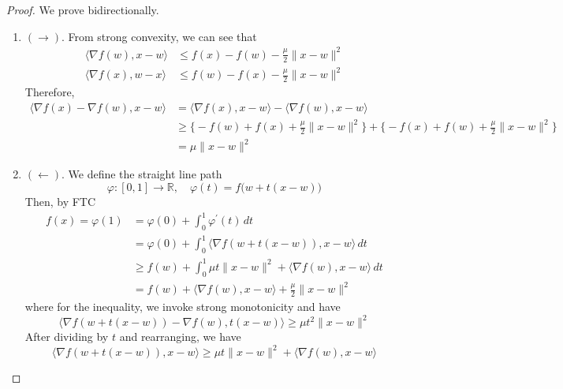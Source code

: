 	\begin{proof}
	  We prove bidirectionally. 
		\begin{enumerate}
		  \item $(\rightarrow)$. From strong convexity, we can see that 
				\begin{align}
					\langle \nabla f(w), x - w \rangle & \leq f(x) - f(w) - \frac{\mu}{2} \|x - w\|^2 \\ 
					\langle \nabla f(x), w - x \rangle & \leq f(w) - f(x) - \frac{\mu}{2} \|x - w\|^2
				\end{align}
				Therefore, 
				\begin{align}
					\langle \nabla f(x) - \nabla f(w), x - w \rangle 
						& = \langle \nabla f(x), x - w \rangle - \langle \nabla f(w), x - w \rangle \\ 
						& \geq \big\{ -f(w) + f(x) + \frac{\mu}{2} \|x - w\|^2 \big\} + \big\{ - f(x) + f(w) + \frac{\mu}{2} \| x - w\|^2 \big\} \\ 
						& = \mu \|x - w\|^2
				\end{align}

			\item $(\leftarrow)$. We define the straight line path 
				\begin{equation}
					\varphi: [0, 1] \to \mathbb{R}, \quad \varphi(t) = f\big( w + t(x - w) \big)
				\end{equation}
				Then, by FTC
				\begin{align}
					f(x) = \varphi(1) & = \varphi(0) + \int_0^1 \varphi^\prime (t) \,dt \\ 
														& = \varphi(0) + \int_0^1 \langle \nabla f(w + t(x - w)), x - w \rangle \,dt  \\ 
														& \geq  f(w) + \int_0^1 \mu t \|x - w\|^2 + \langle \nabla f(w), x - w \rangle \,dt \\
														& = f(w) + \langle \nabla f(w), x - w \rangle + \frac{\mu}{2} \|x - w\|^2
				\end{align}
				where for the inequality, we invoke strong monotonicity and have 
				\begin{equation}
				  \langle \nabla f(w + t(x - w)) - \nabla f(w), t (x - w) \rangle \geq \mu t^2 \|x - w\|^2
				\end{equation}
				After dividing by $t$ and rearranging, we have 
				\begin{equation}
				  \langle \nabla f(w + t(x - w)), x - w \rangle \geq \mu t \|x - w\|^2 + \langle \nabla f(w), x - w \rangle
				\end{equation}
		\end{enumerate}
	\end{proof}

